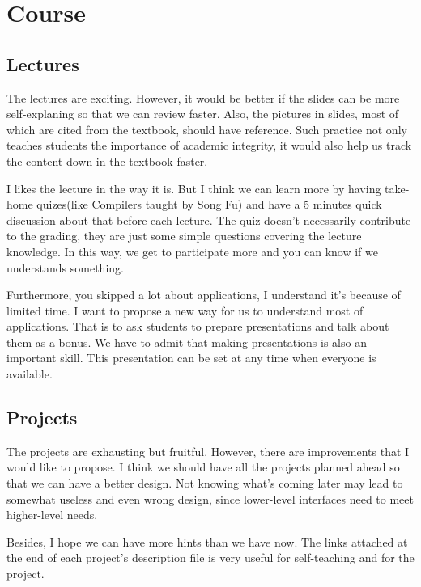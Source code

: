 \documentclass[conference,compsoc]{IEEEtran}
\begin{document}
\section{Course}
	
	\subsection{Lectures}
		The lectures are exciting. 
		However, it would be better if the slides can be more self-explaning so that we can review faster.
		Also, the pictures in slides, most of which are cited from the textbook, should have reference.
		Such practice not only teaches students the importance of academic integrity, it would also help us track the content down in the textbook faster.
		\par
		I likes the lecture in the way it is. 
		But I think we can learn more by having take-home quizes(like Compilers taught by Song Fu) and have a 5 minutes quick discussion about that before each lecture. The quiz doesn't necessarily contribute to the grading, they are just some simple questions covering the lecture knowledge.
		In this way, we get to participate more and you can know if we understands something.
		\par
		Furthermore, you skipped a lot about applications, I understand it's because of limited time.
		I want to propose a new way for us to understand most of applications.
		That is to ask students to prepare presentations and talk about them as a bonus.
		We have to admit that making presentations is also an important skill.
		This presentation can be set at any time when everyone is available.

	\subsection{Projects}
		The projects are exhausting but fruitful. 
		However, there are improvements that I would like to propose.
		I think we should have all the projects planned ahead so that we can have a better design.
		Not knowing what's coming later may lead to somewhat useless and even wrong design, since lower-level interfaces need to meet higher-level needs.
		\par
		Besides, I hope we can have more hints than we have now. 
		The links attached at the end of each project's description file is very useful for self-teaching and for the project.
\end{document}
